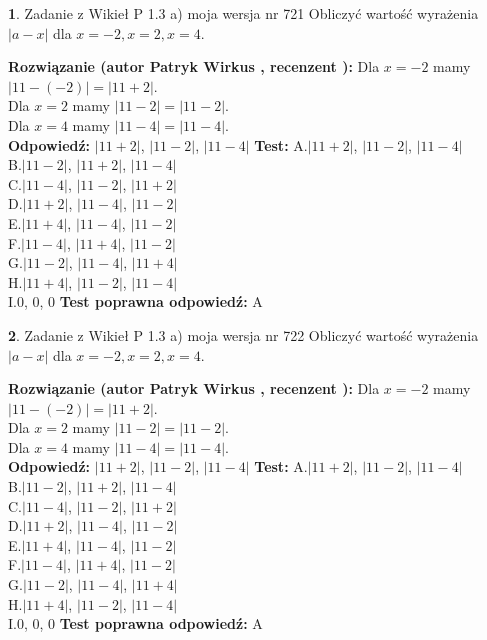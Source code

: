 \documentclass[12pt, a4paper]{article}
\theoremstyle{definition} %
\newtheorem{zad}{}
\newcommand{\zadStart}[1]{\begin{zad}#1\newline}
\newcommand{\zadStop}{\end{zad}}
\newcommand{\rozwStart}[2]{\noindent \textbf{Rozwiązanie (autor #1 , recenzent #2): }\newline}
\newcommand{\rozwStop}{\newline}
\newcommand{\odpStart}{\noindent \textbf{Odpowiedź:}\newline}
\newcommand{\odpStop}{\newline}
\newcommand{\testStart}{\noindent \textbf{Test:}\newline}
\newcommand{\testStop}{\newline}
\newcommand{\kluczStart}{\noindent \textbf{Test poprawna odpowiedź:}\newline}
\newcommand{\kluczStop}{\newline}
\begin{document}
\zadStart{Zadanie z Wikieł P 1.3 a) moja wersja nr 721}
Obliczyć wartość wyrażenia $|a - x|$ dla $x=-2,x=2,x=4$.
\zadStop
\rozwStart{Patryk Wirkus}{}
Dla $x = -2$ mamy $|11 - (-2)| = |11 + 2|$.\\
Dla $x = 2$ mamy $|11 - 2| = |11 - 2|$.\\
Dla $x = 4$ mamy $|11 - 4| = |11 - 4|$.\\
\rozwStop
\odpStart
$|11 + 2|$, $|11 - 2|$, $|11 - 4|$
\odpStop
\testStart
A.$|11 + 2|$, $|11 - 2|$, $|11 - 4|$\\
B.$|11 - 2|$, $|11 + 2|$, $|11 - 4|$\\
C.$|11 - 4|$, $|11 - 2|$, $|11 + 2|$\\
D.$|11 + 2|$, $|11 - 4|$, $|11 - 2|$\\
E.$|11 + 4|$, $|11 - 4|$, $|11 - 2|$\\
F.$|11 - 4|$, $|11 + 4|$, $|11 - 2|$\\
G.$|11 - 2|$, $|11 - 4|$, $|11 + 4|$\\
H.$|11 + 4|$, $|11 - 2|$, $|11 - 4|$\\
I.$0$, $0$, $0$
\testStop
\kluczStart
A
\kluczStop



\zadStart{Zadanie z Wikieł P 1.3 a) moja wersja nr 722}
Obliczyć wartość wyrażenia $|a - x|$ dla $x=-2,x=2,x=4$.
\zadStop
\rozwStart{Patryk Wirkus}{}
Dla $x = -2$ mamy $|11 - (-2)| = |11 + 2|$.\\
Dla $x = 2$ mamy $|11 - 2| = |11 - 2|$.\\
Dla $x = 4$ mamy $|11 - 4| = |11 - 4|$.\\
\rozwStop
\odpStart
$|11 + 2|$, $|11 - 2|$, $|11 - 4|$
\odpStop
\testStart
A.$|11 + 2|$, $|11 - 2|$, $|11 - 4|$\\
B.$|11 - 2|$, $|11 + 2|$, $|11 - 4|$\\
C.$|11 - 4|$, $|11 - 2|$, $|11 + 2|$\\
D.$|11 + 2|$, $|11 - 4|$, $|11 - 2|$\\
E.$|11 + 4|$, $|11 - 4|$, $|11 - 2|$\\
F.$|11 - 4|$, $|11 + 4|$, $|11 - 2|$\\
G.$|11 - 2|$, $|11 - 4|$, $|11 + 4|$\\
H.$|11 + 4|$, $|11 - 2|$, $|11 - 4|$\\
I.$0$, $0$, $0$
\testStop
\kluczStart
A
\kluczStop
\end{document}
